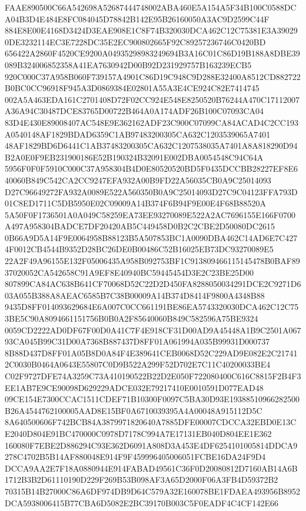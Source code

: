 \documentclass[UTF8,fontset=fandol,zihao=-4,a4paper]{ctexart}
\begin{document}
{{FAAE890500C66A542698A52687444748002ABA460E5A154A5F34B100C0588DCA04B3D4E484E8FC084045D78842B142E95B26160050A3AC9D2599C44F
884E8E00E4168D3424D3EAE908E1C8F74B320030DCA462C12C75381E3A390290DE3232114EC3E7228DC35E2EC900802665F92C89257236746C0420BD
656422A2860F4520CE9200A04935298983249694B3A16C01C86D19B188A8DBE39089B324006852358A41EA7630942D00B92D231929757B163239ECB5
920C000C37A958B060F739157A4901C86D19C948C9D288E32400A8512CD882722B0BC0CC96918F945A3D0869384E02801A55A3E4CE924C82E7414745
002A5A463EDA161C2701408D72F02CC924E548E8250520B76244A470C17112007A36A94C30487DCE83765D00722B464A0A174ADF26B100C07093CA04
83D4E430E89008407AC548E9E362162ADF23C900C07099CA84ACAD4C2CC193A0540148AF1829BDAD6359C1AB97483200305CA632C1203539065A7401
48AF1829BD6D6441C1AB37483200305CA632C1207538035A7401A8A818290D94B2A0E0F9EB231900186E52B190324B32091E002DBA0054548C94C64A
5956F0F0F5910C000C37A958304B4D0E80520520BD5F0435DCCBB28227EF8E640060B849C542CA2CC9247EFA932A00B9FD22A56035CB0A9C25014093
D27C96649272FA932A0089E522A560350B0A9C25014093D27C9C04123FFA793D01C8ED1711C5DB5950E02C09009A14B374F6B94F9E00E4F68B88520A
5A50F0F1736501A0A049C58259EA73EE93270089E522A2AC7696155E166F0700A497A958304BADCE7DF20420AB5C449458D0B2C2CBE2D50080DC2615
0B66A9D5A14F9E0064958B88123B5A507853BC1A0090DBA462C14AD6E7C4274F0012CB4544B9352D28BC26DE0B00486C52B16025EB73DC93270089E5
22A2F49A96155E132F05006435A958B092753BF1C913809466115145478B0BAF8937020052CA542658C91A9EF8E40940BC59445454D3E2C23BE25D00
807899CA84AC638B641CF70068D52C22D2D450FA8288050034291DCE2C9271D603A055B388A8AEAC6585B7C38B00009A14B374D8414F9800A4348B88
9435D8FF014093629684E6A007C0CC661191BE86EA5743320030DCA462C12C753BE5C90A8094661151756B0B0A2F85640060B849C582596A75BE9324
0059CD2222AD0DF67F00D0A41C7F4E918CF31D00AD9A45448A1B9C2501A06793CA045B99C31D00A7368B887437D8FF01A061994A035B99931D000737
8B88D437D8FF01A05B8D0A84F4E389641CEB0068D52C229AD9E082E2C217412C0030B0464A0643E55807C0D9B522A299F52D702E7C11C40200033BE4
C02F9727DFE74A3259C73A410190522B22D2E050F722080400C616C8815F2B4F3EE1AB7E9CE90098D629229ADCE032E79217410E0010591D077EAD48
09CE154E7300CCAC1511CDEF71B10300F0097C5BA30D93E19388510966282500B26A4544762100005AAD8E15BF0A6710039395A4A00048A915112D5C
8A640500606F742BCB84A3879971820640A7885DFE00007CDCCA32EBD0E13CE2040D804E91BC470000C0978D7178C994A7E17131EB040D804EE1E362
160080F7EBE2D886294C93E362D6091A808D3A453E4DF6254101005814DDCA9278C4702B5B14AF880048E914F9F459996405006051FCBE16DA24F9D4
DCCA9AA2E7F18A0880944E914FABAD49561C36F0D20080812D7160AB14A6B1712B3B2D61110190D229F269B53B098AF3A65D2000F06A3FB4D59372B2
70315B14B27000C86A6DF974DB9D64C579A32E160078BE1FDAEA493956B8952DCA5938006415B77CBA6D5082E2BC39170B003C5F0EADF4C4CF142E66
}}
\end{document}
